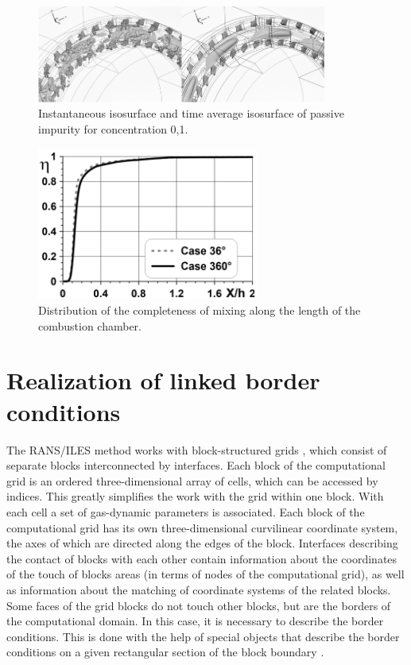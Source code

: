 \documentclass[
11pt,%
tightenlines,%
twoside,%
onecolumn,%
nofloats,%
nobibnotes,%
nofootinbib,%
superscriptaddress,%
noshowpacs,%
centertags]%
{revtex4}
\begin{document}
\begin{figure}[h]
\setcaptionmargin{5mm}
\onelinecaptionstrue
\includegraphics[width=0.85\textwidth]{pics/p5.png}
\caption{Instantaneous isosurface and time average isosurface of passive impurity for concentration 0,1.}
\label{fig:p4}
\end{figure}

\begin{figure}[h]
\setcaptionmargin{5mm}
\onelinecaptionstrue
\includegraphics[width=0.65\textwidth]{pics/p6.png}
\caption{Distribution of the completeness of mixing along the length of the combustion chamber.}
\label{fig:p4}
\end{figure}

\section{Realization of linked border conditions}

The RANS/ILES method works with block-structured grids \cite{Farrashkhalvat,Liseikin}, which consist of separate blocks interconnected by interfaces.
Each block of the computational grid is an ordered three-dimensional array of cells, which can be accessed by indices.
This greatly simplifies the work with the grid within one block.
With each cell a set of gas-dynamic parameters is associated.
Each block of the computational grid has its own three-dimensional curvilinear coordinate system, the axes of which are directed along the edges of the block.
Interfaces describing the contact of blocks with each other contain information about the coordinates of the touch of blocks areas (in terms of nodes of the computational grid), as well as information about the matching of coordinate systems of the related blocks.
Some faces of the grid blocks do not touch other blocks, but are the borders of the computational domain.
In this case, it is necessary to describe the border conditions.
This is done with the help of special objects that describe the border conditions on a given rectangular section of the block boundary \cite{Rybakov}.
\end{document}
